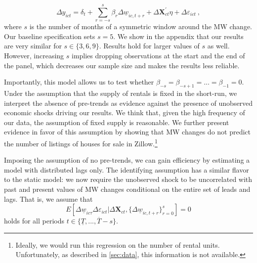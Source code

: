 \begin{equation} \label{eq:leads_lags}
	\Delta y_{ict} = \delta_t
				  + \sum_{r=-s}^{s} \beta_r \Delta \underline{w}_{ic,t+r}
    			  + \Delta \mathbf{X}^{'}_{ct}\eta
    			  + \Delta \varepsilon_{ict} \ ,
\end{equation}
where $s$ is the number of months of a symmetric window around the MW change. Our baseline
specification sets $s = 5$. We show in the appendix that our results are very similar for
$s \in \{3, 6, 9\}$. Results hold for larger values of $s$ as well. However, increasing $s$ 
implies dropping observations at the start and the end of the panel, which decreases our 
sample size and makes the results less reliable.

Importantly, this model allows us to test whether $\beta_{-s} = \beta_{-s+1} = ... 
= \beta_{-1} = 0$. Under the assumption that the supply of rentals is fixed in the short-run, 
we interpret the absence of pre-trends as evidence against the presence of unobserved economic 
shocks driving our results. We think that, given the high frequency of our data, the 
assumption of fixed supply is reasonable. We further present evidence in favor of this 
assumption by showing that MW changes do not predict the number of listings of houses for sale 
in Zillow.\footnote{Ideally, we would run this regression on the number of rental units. 
	Unfortunately, as described in \autoref{sec:data}, this information is not available.}

Imposing the assumption of no pre-trends, we can gain efficiency by estimating a model with 
distributed lags only. %
The identifying assumption has a similar flavor to the static model: we now require the 
unobserved shock to be uncorrelated with past and present values of MW changes conditional 
on the entire set of leads and lags. That is, we assume that
\begin{equation*}\label{eq:identifying-lags}
	E\left[\Delta \underline{w}_{ic \tau} \Delta \varepsilon_{ict} | 
			\Delta \mathbf{X}_{ct}, \{\Delta \underline{w}_{ic,t+r}\}_{r=0}^s \right] = 0
\end{equation*}
holds for all periods $t \in \{\underline{T}, ..., \overline{T} - s\}$.


